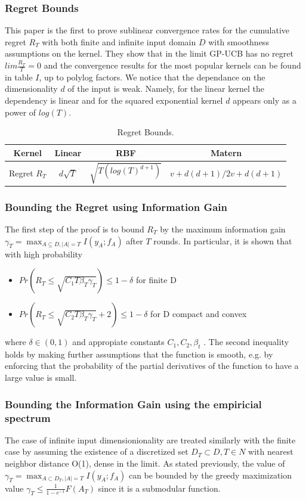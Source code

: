 \documentclass[10pt,journal,a4paper]{IEEEtran}
\begin{document}
\subsubsection{Regret Bounds}

This paper is the first to prove sublinear convergence rates for the cumulative regret $R_T$ with both finite and infinite input domain $D$ with smoothness assumptions on the kernel. They show that in the limit GP-UCB has no regret $lim \frac{R_T}{T}= 0$ and the convergence results for the most popular kernels can be found in table $I$, up to polylog factors. We notice that the dependance on the dimensionality $d$ of the input is weak. Namely, for the linear kernel the dependency is linear and for the squared exponential kernel $d$ appears only as a power of $log(T)$.
\begin{table}
\begin{tabular}{|c||c|c|c|}
\hline
Kernel & Linear & RBF & Matern\\
\hline
Regret $R_T$ & $d\sqrt{T}$& $\sqrt{T(log(T)^{d+1})} $ &${v+d(d+1)/2v+d(d+1)}$\\
\hline
\end{tabular}
\label{bounds}
\caption{Regret Bounds.}
\end{table}


\subsubsection{Bounding the Regret using Information Gain}
The first step of the proof is to bound $R_T$ by the maximum information gain $\gamma_T = \max_{A \subseteq D, |A| = T} I(y_A;f_A)$ after $T$ rounds.
In particular, it is shown that with high probability
\begin{itemize}
\item $Pr(R_T \leq \sqrt{C_1T\beta_T\gamma_T}) \leq 1- \delta$ for finite D
\item$Pr(R_T \leq \sqrt{C_2T\beta_T\gamma_T} + 2) \leq 1- \delta$ for  D compact and convex 
\end{itemize}
where $\delta \in (0,1)$ and appropiate constants $C_1, C_2, \beta_t$ . The second inequality holds by making further assumptions that the function is smooth, e.g. by enforcing that the probability of the partial derivatives of the function to have a large value is small.

\subsubsection{Bounding the Information Gain using the empiricial spectrum}
The case of  infinite input dimensionionality are treated similarly with the finite case by assuming the existence of a discretized set $D_T \subset D, T \in N $ with nearest neighbor distance O(1), dense in the limit. As stated previously, the value of $\gamma_T= \max_{A\subset D_T, |A|=T} I(y_A; f_A)$ can be bounded by the greedy maximization value $ \gamma_T \leq \frac{1}{1-e^{-1}} F(A_T)$ since it is a submodular function. 
\end{document}
